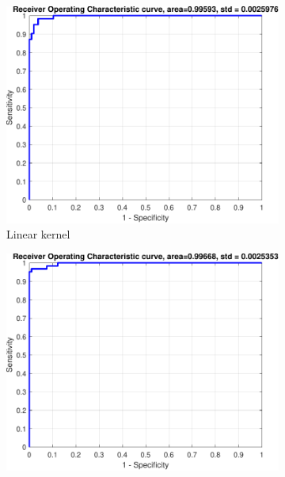 \documentclass{article}
\begin{document}
        
        \begin{figure}[h]
             \centering
             \begin{subfigure}[b]{0.3\textwidth}
                 \centering
                 \includegraphics[width=\textwidth]{Assignment 1/figures/breast_linear_classifier_roc.pdf}
                \caption{Linear kernel}
                 \label{fig:breast_liner_roc}
             \end{subfigure}
             \hfill
             \begin{subfigure}[b]{0.3\textwidth}
                 \centering
                 \includegraphics[width=\textwidth]{Assignment 1/figures/breast_rbf_classifier_roc.pdf}

\end{subfigure}
\end{figure}
\end{document}
